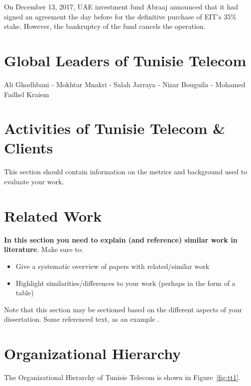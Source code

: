 On December 13, 2017, UAE investment fund Abraaj announced that it had signed an agreement the day before for the definitive purchase of EIT's 35\% stake. However, the bankruptcy of the fund cancels the operation.





{}

\section{Global Leaders of Tunisie Telecom}%
Ali Ghodhbani - Mokhtar Mnakri - Salah Jarraya - Nizar Bouguila - Mohamed Fadhel Kraiem



\section{Activities of Tunisie Telecom \& Clients}%
This section should contain information on the metrics and background used to evaluate your work.
\section{Related Work}
\textbf{In this section you need to explain (and reference) similar work in literature}.  Make sure to:

\begin{itemize}
 \item Give a systematic overview of papers with related/similar work
 \item Highlight similarities/differences to your work (perhaps in the form of a table)
\end{itemize}

Note that this section may be sectioned based on the different aspects of your dissertation.  Some referenced text, as an example \citep{Arrighi2003, WithersMartinez2012, Ebejer2016}.

\section{Organizational Hierarchy}
The Organizational Hierarchy of Tunisie Telecom is shown in Figure~\ref{fig:tt1}.


